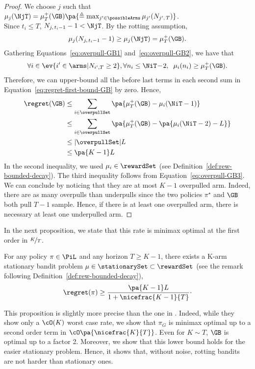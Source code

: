 \begin{proof}
We choose $j$ such that $ \mu_j(\NjT) = \mu^+_T(\GB) \pa{\triangleq \max_{j'\in \possibleArms} \mu_{j'}(N_{j',\,T})}$. \\Since $t_i \leq T$, $N_{j,\,t_i-1} - 1 < \NjT$. By the rotting assumption, 
\begin{equation}
\label{eq:overpull-GB2}
 \mu_j(N_{j,\,t_i-1} - 1) \geq \mu_j(\NjT) = \mu^+_T(\GB).
\end{equation}
%
Gathering Equations~\ref{eq:overpull-GB1} and~\ref{eq:overpull-GB2}, we have that 
\begin{equation}
\label{eq:overpull-GB3} 
\forall i \in \ev{i' \in \arms | N_{i',T} \geq 2}, \forall n_i \leq \NiT \!-\! 2, \;\;  \mu_i(n_i) \geq \mu^+_T(\GB).
\end{equation}
Therefore,  we can upper-bound all the before last terms in each second sum in Equation~\ref{eq:regret-first-bound-GB} by zero. Hence, 
\begin{align*}
\regret(\GB) &\leq \sum_{i\in \overpullSet} \pa{\mu^+_T(\GB) - \mu_i(\NiT-1)}\\
&\leq \sum_{i\in \overpullSet} \pa{\mu^+_T(\GB) - \pa{\mu_i(\NiT-2) - L}}\\
&\leq |\overpullSet| L \\
&\leq \pa{K-1} L
\end{align*}
In the second inequality, we used $\mu_i \in \rewardSet$ (see Definition~\ref{def:rew-bounded-decay}). The third inequality follows from Equation~\ref{eq:overpull-GB3}. We can conclude by noticing that they are at most $K-1$ overpulled arm. Indeed, there are as many overpulls than underpulls since the two policies $\pi^\star$ and $\GB$ both pull $T-1$ sample. Hence, if there is at least one overpulled arm, there is necessary at least one underpulled arm. 
\end{proof}

In the next proposition, we state that this rate is minimax optimal at the first order in $\nicefrac{K}{T}$.

\begin{proposition}
\label{prop:lb-noisefree}
For any policy $\pi\in \PiL$ and any horizon $T \geq K-1$, there exists a K-arm stationary bandit problem $\mu \in \stationarySet \subset \rewardSet$ (see the remark following Definition~\ref{def:rew-bounded-decay}), 
\[\regret (\pi) \geq \frac{\pa{K-1}L}{1+ \nicefrac{K-1}{T}}\cdot\]
\end{proposition}
This proposition is slightly more precise than the one in \citet{heidari2016tight}. Indeed, while they show only a $\cO(K)$ worst case rate, we show that $\pi_G$ is minimax optimal up to a second order term in $\cO\pa{\nicefrac{K}{T}}$. Even for $K\sim T$, $\GB$ is optimal up to a factor 2. Moreover, we show that this lower bound holds for the easier stationary problem. Hence, it shows that, without noise, rotting bandits are not harder than stationary ones.

